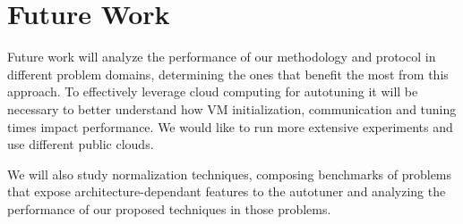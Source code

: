 \section{Future Work}
\label{sec:future}

Future work will analyze the performance of our methodology and protocol in
different problem domains, determining the ones that benefit the most from this
approach. To effectively leverage cloud computing for autotuning it will be
necessary to better understand how VM initialization,
communication and tuning times impact performance. We would like to run more
extensive experiments and use different public clouds.

We will also study normalization techniques, composing benchmarks of problems
that expose architecture-dependant features to the autotuner and analyzing the
performance of our proposed techniques in those problems.
